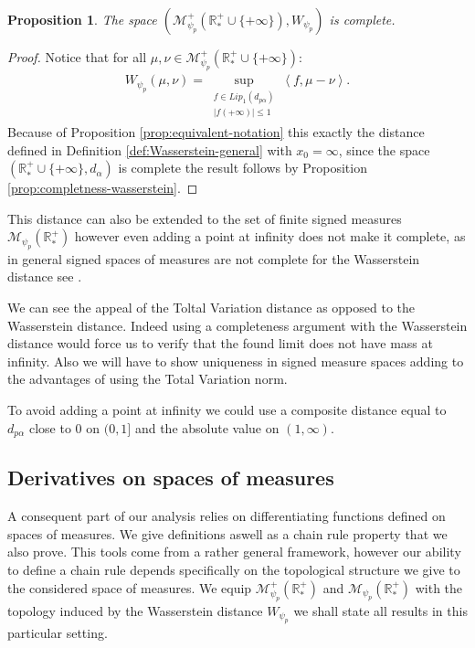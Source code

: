 \documentclass[11pt,a4paper]{article}
\newcommand{\RRP}{\mathbb{R}^+_*}
\newcommand{\MC}{\mathcal{M}}
\newcommand{\brac}[1]{\left\langle#1\right\rangle}
\newtheorem{proposition}[theorem]{Proposition}
\begin{document}
\begin{proposition}
    The space $\left( \MC^+_{\psi_p}\left(\RRP \cup \lbrace+\infty\rbrace\right),W_{\psi_p}\right) $ is complete.
\end{proposition}
\begin{proof}
    Notice that for all $\mu,\nu \in \MC^+_{\psi_p}\left(\RRP \cup \lbrace+\infty\rbrace\right)$:
    \begin{align*}
        W_{\psi_p}(\mu,\nu) = \sup_{\substack{f \in Lip_1(d_{p\alpha}) \\ |f(+\infty)| \leq 1 }} \brac{f, \mu - \nu}.
    \end{align*}
    Because of Proposition \ref{prop:equivalent-notation} this exactly the distance defined in Definition \ref{def:Wasserstein-general} with $x_0 = \infty$, since the space $\left(\RRP \cup \lbrace+\infty\rbrace ,d_\alpha\right)$ is complete the result follows by Proposition \ref{prop:completness-wasserstein}.
\end{proof}
This distance can also be extended to the set of finite signed measures $\MC_{\psi_p}(\RRP)$ however even adding a point at infinity does not make it complete, as in general signed spaces of measures are not complete for the Wasserstein distance see \cite{piccoli2019wasserstein}.

We can see the appeal of the Toltal Variation distance as opposed to the Wasserstein distance. Indeed using a completeness argument with the Wasserstein distance would force us to verify that the found limit does not have mass at infinity. Also we will have to show uniqueness in signed measure spaces adding to the advantages of using the Total Variation norm. 

To avoid adding a point at infinity we could use a composite distance equal to $d_{p\alpha}$ close to $0$ on $(0,1]$ and the absolute value on $(1, \infty)$. 
\subsection{Derivatives on spaces of measures}
A consequent part of our analysis relies on differentiating functions defined on spaces of measures. We give definitions aswell as a chain rule property that we also prove. This tools come from a rather general framework, however our ability to define a chain rule depends specifically on the topological structure we give to the considered space of measures. We equip $\MC^+_{\psi_p}(\RRP)$ and $\MC_{\psi_p}(\RRP)$ with the topology induced by the Wasserstein distance $W_{\psi_p}$ we shall state all results in this particular setting.
\end{document}
